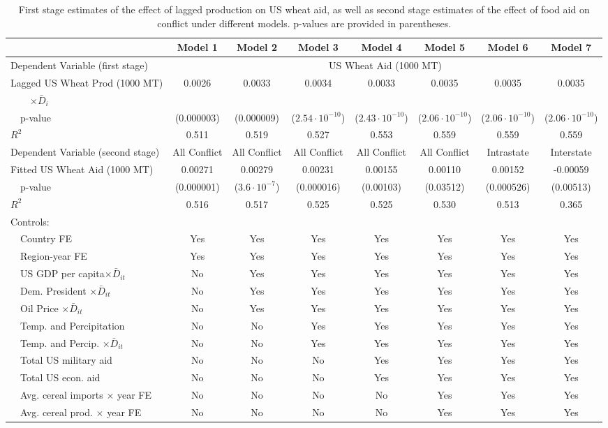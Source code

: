 \documentclass{article}
\begin{document}
\begin{table}
\centering
\scriptsize
\begin{tabular}{| l | c | c | c | c | c | c | c |}
\hline
& Model 1 & Model 2 & Model 3 & Model 4 & Model 5 & Model 6 & Model 7\\
\hline
Dependent Variable (first stage) & \multicolumn{7}{|c|}{US Wheat Aid (1000 MT)}\\
\hline 
Lagged US Wheat Prod (1000 MT) & 0.0026 & 0.0033  & 0.0034  & 0.0033  & 0.0035  & 0.0035  & 0.0035  \\
~~~~$\times \bar D_{i}$ & & & & & & & \\
~~p-value & (0.000003) & (0.000009) & ($2.54 \cdot 10^{-10}$) & ($2.43 \cdot 10^{-10}$) & ($2.06 \cdot 10^{-10}$) & ($2.06 \cdot 10^{-10}$) & ($2.06 \cdot 10^{-10}$)\\
$R^2$ & 0.511 & 0.519 & 0.527 & 0.553 & 0.559 & 0.559 & 0.559 \\
\hline
Dependent Variable (second stage) & All Conflict &  All Conflict &  All Conflict &  All Conflict & All Conflict & Intrastate & Interstate \\
\hline 
Fitted US Wheat Aid (1000 MT) & 0.00271 & 0.00279  & 0.00231 &0.00155 & 0.00110  & 0.00152  & -0.00059 \\
~~p-value & (0.000001) & ($3.6 \cdot 10^{-7}$) & (0.000016) & (0.00103) & (0.03512) & (0.000526) & (0.00513)\\
$R^2$ & 0.516 & 0.517 & 0.525 & 0.525 & 0.530 & 0.513 & 0.365  \\
\hline
Controls:&  \multicolumn{7}{|c|}{~}\\
~~Country FE & Yes & Yes & Yes & Yes & Yes & Yes & Yes \\
~~Region-year FE & Yes & Yes & Yes & Yes & Yes & Yes & Yes \\
~~US GDP per capita$\times \bar D_{it}$  & No & Yes & Yes & Yes & Yes & Yes & Yes \\
~~Dem. President $\times \bar D_{it}$ & No & Yes & Yes & Yes & Yes & Yes & Yes \\
~~Oil Price $\times \bar D_{it}$ & No & Yes & Yes & Yes & Yes & Yes & Yes \\
~~Temp. and Percipitation & No & No & Yes & Yes & Yes & Yes & Yes \\
~~Temp. and Percip. $\times \bar D_{it}$& No & No & Yes & Yes & Yes & Yes & Yes \\
~~Total US military aid  & No & No & No & Yes & Yes & Yes & Yes \\
~~Total US econ. aid & No & No & No & Yes & Yes & Yes & Yes \\
~~Avg. cereal imports $\times$ year FE & No & No & No & No & Yes & Yes & Yes \\
~~Avg. cereal prod. $\times$ year FE & No & No & No & No & Yes & Yes & Yes \\
\hline
\end{tabular}
\label{2sls}
\normalsize
\caption{First stage estimates of the effect of lagged production on US wheat aid, as well as second stage estimates of the effect of food aid on conflict under different models. p-values are provided in parentheses.}
\end{table}
\end{document}
